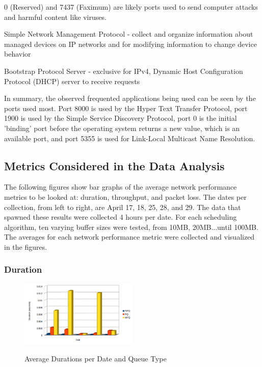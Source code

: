 \documentclass[journal]{IEEE/IEEEtran}
\begin{document}
0 (Reserved) and 7437 (Faximum) are likely ports used to send computer attacks and harmful content like viruses.

Simple Network Management Protocol - collect and organize information about managed devices on IP networks and for modifying information to change device behavior

Bootstrap Protocol Server - exclusive for IPv4, Dynamic Host Configuration Protocol (DHCP) server to receive requests






In summary, the observed frequented applications being used can be seen by the ports used most. Port 8000 is used by the Hyper Text Transfer Protocol, port 1900 is used by the Simple Service Discovery Protocol, port 0 is the initial 'binding' port before the operating system returns a new value, which is an available port, and port 5355 is used for Link-Local Multicast Name Resolution.

\subsection{Metrics Considered in the Data Analysis}
The following figures show bar graphs of the average network performance metrics to be looked at: duration, throughput, and packet loss. The dates per collection, from left to right, are April 17, 18, 25, 28, and 29. The data that spawned these results were collected 4 hours per date. For each scheduling algorithm, ten varying buffer sizes were tested, from 10MB, 20MB...until 100MB. The averages for each network performance metric were collected and visualized in the figures.

\subsubsection{Duration}

\begin{figure}
\includegraphics[width=0.5\textwidth]{duration}
\label{fig:duration}\caption{Average Durations per Date and Queue Type}
\end{figure}
\end{document}
